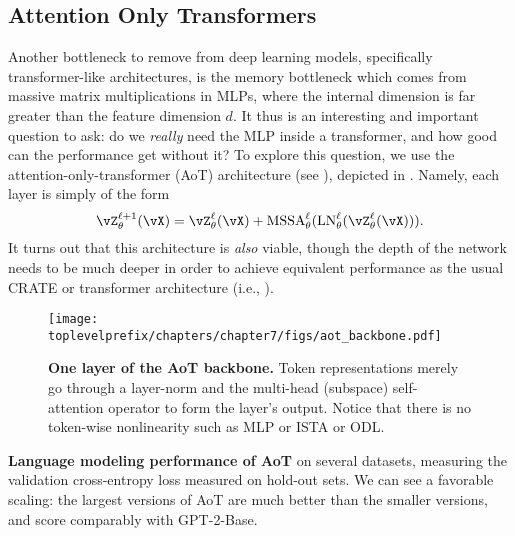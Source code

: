 \documentclass[\toplevelprefix/book-main.tex]{subfiles}
\begin{document}
\subsection{Attention Only Transformers} \label{sub:aot_experiments}

Another bottleneck to remove from deep learning models, specifically transformer-like architectures, is the memory bottleneck which comes from massive matrix multiplications in MLPs, where the internal dimension is far greater than the feature dimension \(d\). It thus is an interesting and important question to ask: do we \textit{really} need the MLP inside a transformer, and how good can the performance get without it? To explore this question, we use the attention-only-transformer (AoT) architecture (see ), depicted in . Namely, each layer is simply of the form 
\begin{equation}
    \vZ_{\theta}^{\ell + 1}(\vX) = \vZ_{\theta}^{\ell}(\vX) + \MSSA_{\theta}^{\ell}(\LN_{\theta}^{\ell}(\vZ_{\theta}^{\ell}(\vX))).
\end{equation}
It turns out that this architecture is \textit{also} viable, though the depth of the network needs to be much deeper in order to achieve equivalent performance as the usual CRATE or transformer architecture (i.e., ).


\begin{figure}
    \centering 
    \texttt{[image: \\toplevelprefix/chapters/chapter7/figs/aot\_backbone.pdf]}
    \caption{\small\textbf{One layer of the AoT backbone.} Token representations merely go through a layer-norm and the multi-head (subspace) self-attention operator to form the layer's output. Notice that there is no token-wise nonlinearity such as MLP or ISTA or ODL.}
    \label{fig:aot_backbone}
\end{figure}

\begin{table}
    \centering 
    \caption{\small\textbf{Language modeling performance of AoT} on several datasets, measuring the validation cross-entropy loss measured on hold-out sets. We can see a favorable scaling: the largest versions of AoT are much better than the smaller versions, and score comparably with GPT-2-Base.}
    \label{tab:aot_lm}
\end{table}
\end{document}

